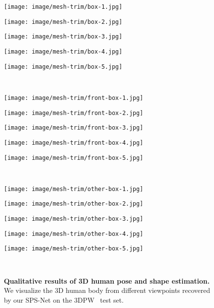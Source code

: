 \documentclass[times,referee,twocolumn,final,authoryear]{elsarticle}
\newcommand{\mpage}[2]
{
\begin{minipage}{#1\textwidth}\centering
#2
\end{minipage}
}
\begin{document}
\begin{figure*}[t]
  \begin{center}
  \mpage{0.18}{\texttt{[image: image/mesh-trim/box-1.jpg]}} \hfill
  \mpage{0.18}{\texttt{[image: image/mesh-trim/box-2.jpg]}} \hfill
  \mpage{0.18}{\texttt{[image: image/mesh-trim/box-3.jpg]}} \hfill
  \mpage{0.18}{\texttt{[image: image/mesh-trim/box-4.jpg]}} \hfill
  \mpage{0.18}{\texttt{[image: image/mesh-trim/box-5.jpg]}} \\
  \vspace{0.5mm}
  \mpage{0.18}{\texttt{[image: image/mesh-trim/front-box-1.jpg]}} \hfill
  \mpage{0.18}{\texttt{[image: image/mesh-trim/front-box-2.jpg]}} \hfill
  \mpage{0.18}{\texttt{[image: image/mesh-trim/front-box-3.jpg]}} \hfill
  \mpage{0.18}{\texttt{[image: image/mesh-trim/front-box-4.jpg]}} \hfill
  \mpage{0.18}{\texttt{[image: image/mesh-trim/front-box-5.jpg]}} \\
  \vspace{-1.5mm}
  \mpage{0.18}{\texttt{[image: image/mesh-trim/other-box-1.jpg]}} \hfill
  \mpage{0.18}{\texttt{[image: image/mesh-trim/other-box-2.jpg]}} \hfill
  \mpage{0.18}{\texttt{[image: image/mesh-trim/other-box-3.jpg]}} \hfill
  \mpage{0.18}{\texttt{[image: image/mesh-trim/other-box-4.jpg]}} \hfill
  \mpage{0.18}{\texttt{[image: image/mesh-trim/other-box-5.jpg]}} \\
\vspace{-3.0mm}
  \caption{
  \textbf{Qualitative results of 3D human pose and shape estimation.} 
We visualize the 3D human body from different viewpoints recovered by our SPS-Net on the 3DPW~\citep{3DPW} test set.
}
  \label{fig:mesh}
  \end{center}
  \vspace{-6.0mm}
\end{figure*}
\end{document}
